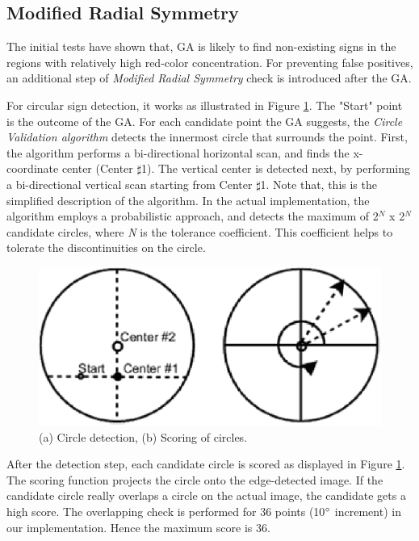 \documentclass[twocolumn,letterpaper,10pt]{article}
\begin{document}
\subsection{Modified Radial Symmetry}
The initial tests have shown that, GA is likely to find non-existing signs in the regions with relatively high red-color concentration. For preventing false positives, an additional step of \textsl{Modified Radial Symmetry} check is introduced after the GA. 
\par
For circular sign detection, it works as illustrated in Figure \ref{fig:rad_1}. The "Start" point is the outcome of the GA. For each candidate point the GA suggests, the \textit{\textit{Circle Validation algorithm}} detects the innermost circle that surrounds the point. First, the algorithm performs a bi-directional horizontal scan, and finds the x-coordinate center (Center $\sharp$1). The vertical center is detected next, by performing a bi-directional vertical scan starting from Center $\sharp$1. Note that, this is the simplified description of the algorithm. In the actual implementation, the algorithm employs a probabilistic approach, and detects the maximum of 2$^\textit{N}$ x 2$^\textit{N}$ candidate circles, where \textit{N} is the tolerance coefficient. This coefficient helps to tolerate the discontinuities on the circle.
\begin{figure}[ht]
\begin{center}
\includegraphics[scale=0.5]{img/fig_radial1.eps}
\caption{(a) Circle detection, (b) Scoring of circles.}
\label{fig:rad_1}
\end{center}
\end{figure}
\par
After the detection step, each candidate circle is scored as displayed in Figure \ref{fig:rad_1}. The scoring function projects the circle onto the edge-detected image. If the candidate circle really overlaps a circle on the actual image, the candidate gets a high score. The overlapping check is performed for 36 points (10$\degree$ increment) in our implementation. Hence the maximum score is 36.
\end{document}
